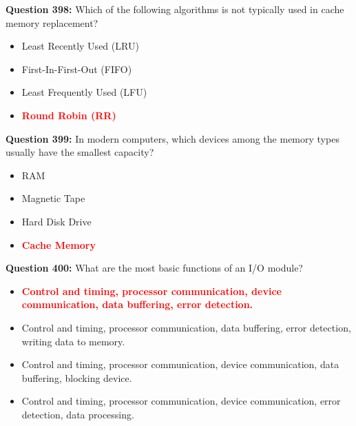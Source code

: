 \documentclass[12pt,a4paper]{article}
\begin{document}
\vspace{0.5cm}

\textbf{Question 398:} Which of the following algorithms is not typically used in cache memory replacement?

\begin{itemize}
    \item[\textbf{A.}] Least Recently Used (LRU)
    \item[\textbf{B.}] First-In-First-Out (FIFO)
    \item[\textbf{C.}] Least Frequently Used (LFU)
    \item[\textbf{D.}] \textcolor{red}{\textbf{Round Robin (RR)}}
\end{itemize}

\vspace{0.5cm}

\textbf{Question 399:} In modern computers, which devices among the memory types usually have the smallest capacity?

\begin{itemize}
    \item[\textbf{A.}] RAM
    \item[\textbf{B.}] Magnetic Tape
    \item[\textbf{C.}] Hard Disk Drive
    \item[\textbf{D.}] \textcolor{red}{\textbf{Cache Memory}}
\end{itemize}

\vspace{0.5cm}

\textbf{Question 400:} What are the most basic functions of an I/O module?

\begin{itemize}
    \item[\textbf{A.}] \textcolor{red}{\textbf{Control and timing, processor communication, device communication, data buffering, error detection.}}
    \item[\textbf{B.}] Control and timing, processor communication, data buffering, error detection, writing data to memory.
    \item[\textbf{C.}] Control and timing, processor communication, device communication, data buffering, blocking device.
    \item[\textbf{D.}] Control and timing, processor communication, device communication, error detection, data processing.
\end{itemize}

\vspace{0.5cm}
\end{document}
